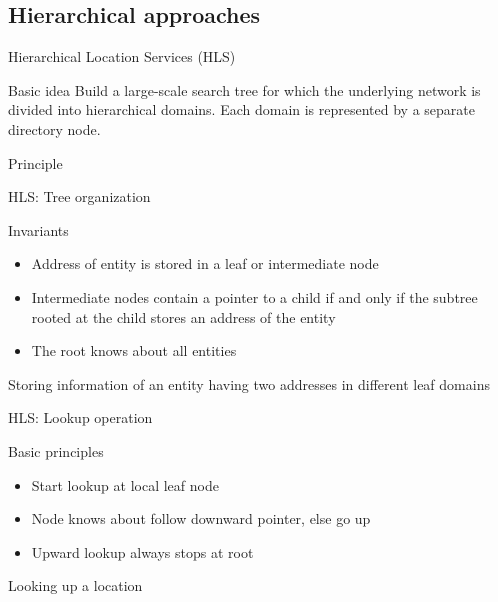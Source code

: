 \subsection{Hierarchical approaches}
\begin{slide}{Hierarchical Location Services (HLS)}
  \vspace*{-6pt}
  \begin{block}{Basic idea} 
    Build a large-scale search tree for which the underlying network is divided into hierarchical
    domains. Each domain is represented by a separate directory node.
  \end{block}
  \begin{block}{Principle}
    \begin{center}
    \end{center}
  \end{block}
\end{slide}
\begin{slide}{HLS: Tree organization}
  \vspace*{-6pt}
  \begin{block}{Invariants}
    \begin{itemize}\tightlist
    \item Address of entity  is stored in a leaf or intermediate node
    \item Intermediate nodes contain a pointer to a child if and only if the subtree rooted at the child
      stores an address of the entity
    \item The root knows about all entities
    \end{itemize}
  \end{block}
  \begin{block}{Storing information of an entity having two addresses in different
      leaf domains}
    \begin{center}
    \end{center}
  \end{block}
\end{slide}
\begin{slide}{HLS: Lookup operation}
  \begin{block}{Basic principles}
    \begin{itemize}\tightlist
    \item Start lookup at local leaf node
    \item Node knows about   \mathexpr{\Rightarrow} follow downward pointer, else go up
    \item Upward lookup always stops at root
    \end{itemize}
  \end{block}
  \begin{block}{Looking up a location}
    \begin{center}
    \end{center}
  \end{block}
\end{slide}
